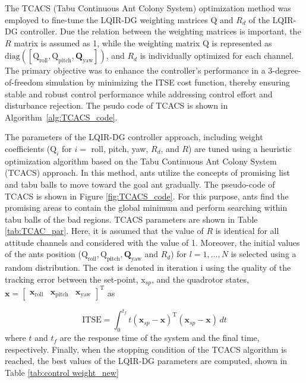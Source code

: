 \documentclass[3p]{elsarticle}
\begin{document}
The TCACS (Tabu Continuous Ant Colony System) optimization method was employed to fine-tune the LQIR-DG weighting matrices $\boldsymbol{\mathrm{Q}}$ and $R_d$ of the LQIR-DG controller.
Due the relation between the weighting matrices is important, the $R$ matrix is assumed as 1, while the weighting matrix $\boldsymbol{\mathrm{Q}}$ is represented as $\text{diag}([\boldsymbol{\mathrm{Q}}_{\text{roll}}, \boldsymbol{\mathrm{Q}}_{\text{pitch}}, \boldsymbol{{Q}}_{\text{yaw}}])$, and $R_d$ is individually optimized for each channel.
The primary objective was to enhance the controller's performance in a 3-degree-of-freedom simulation by minimizing the ITSE cost function, thereby ensuring stable and robust control performance while addressing control effort and disturbance rejection. %
The psudo code of TCACS is shown in Algorithm~\ref{alg:TCACS_code}.




The parameters of the LQIR-DG controller approach, including weight coefficients ($\boldsymbol{\mathrm{Q}}_i$ for $i=$ roll, pitch, yaw, $R_d$, and $R$) are tuned using a heuristic optimization algorithm based on the Tabu Continuous Ant Colony System (TCACS) \cite{article_TCACS} approach. In this method, ants utilize the concepts of promising list and tabu balls to move toward the goal ant gradually. The pseudo-code of TCACS is shown in Figure \ref{fig:TCACS_code}. For this purpose, ants find the promising areas to contain the global minimum and perform searching within tabu balls of the bad regions. TCACS parameters are shown in Table \ref{tab:TCAC_par}. Here, it is assumed that the value of $R$ is identical for all attitude channels and considered with the value of 1. Moreover, the initial values of the ants position ($ \boldsymbol{\mathrm{Q}}_{\text{roll}}, \boldsymbol{\mathrm{Q}}_{\text{pitch}}, \boldsymbol{{Q}}_{\text{yaw}}$ and $R_d$) for $l=1, \ldots, N$ is selected using a random distribution. The cost is denoted in iteration i using the quality of the tracking error between the set-point, $\boldsymbol{\mathrm{x}}_{sp}$, and the quadrotor states, $\boldsymbol{x} = \begin{bmatrix}
    \boldsymbol{x}_{\text{roll}} & \boldsymbol{x}_{\text{pitch}} & \boldsymbol{x}_{\text{yaw}}
\end{bmatrix}^{\mathrm{T}}$ as

\begin{equation}
    \text{ITSE} = \int_{0}^{t_f} t \left(
        \boldsymbol{x}_{sp} - \boldsymbol{x} 
        \right)^\mathrm{T} \left(\boldsymbol{x}_{sp} - \boldsymbol{x} \right) \, dt
\end{equation}
where $t$ and $t_f$ are the response time of the system and the final time, respectively. Finally, when the stopping condition of the TCACS algorithm is reached, the best values of the LQIR-DG parameters are computed, shown in Table \ref{tab:control weight_new}
\end{document}
